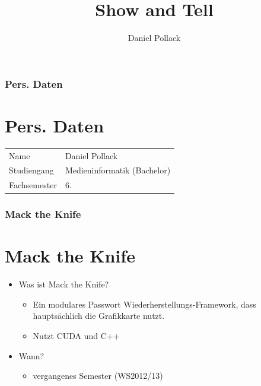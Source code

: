 \documentclass{beamer}
\title{Show and Tell}
\author{Daniel Pollack}
\begin{document}
\begin{frame}
	\maketitle
\end{frame}

\begin{frame}
	\tableofcontents
\end{frame}

\begin{frame}
	\frametitle{Pers. Daten}
	\section{Pers. Daten}

	\centering
	\begin{tabular}{ll}
		Name & Daniel Pollack\\
		Studiengang & Medieninformatik (Bachelor)\\
		Fachsemester & 6.
	\end{tabular}
\end{frame}

\begin{frame}
	\frametitle{Mack the Knife}
	\section{Mack the Knife}

	\begin{itemize}
	  \item Was ist Mack the Knife?
	    \begin{itemize}
	     \item Ein modulares Passwort Wiederherstellungs-Framework, dass hauptsächlich die Grafikkarte nutzt.
	     \item Nutzt CUDA und C++
	    \end{itemize}
	  \item Wann?
	    \begin{itemize}
	     \item vergangenes Semester (WS2012/13)
	    \end{itemize}
	\end{itemize}
\end{frame}
\end{document}
